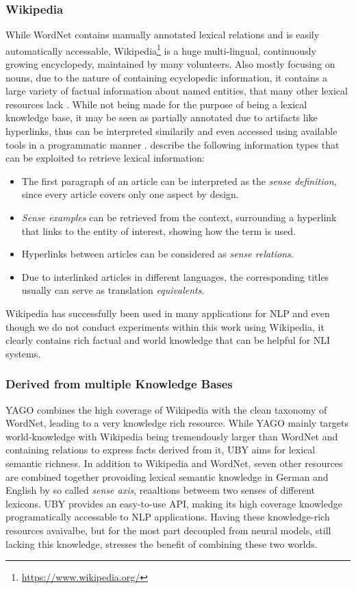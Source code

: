 \subsubsection{Wikipedia}
While WordNet contains manually annotated lexical relations and is easily automatically accessable, Wikipedia\footnote{\href{https://www.wikipedia.org/}{https://www.wikipedia.org/}} is a huge multi-lingual, continuously growing  encyclopedy, maintained by many volunteers. Also mostly focusing on nouns, due to the nature of containing ecyclopedic information, it contains a large variety of factual information about named entities, that many other lexical resources lack \citep{gurevych2016linked}. While not being made for the purpose of being a lexical knowledge base, it may be seen as partially annotated due to artifacts like hyperlinks, thus can be interpreted similarily and even accessed using available tools in a programmatic manner \citep{zesch2008extracting}.  \cite{gurevych2016linked} describe the following information types that can be exploited to retrieve lexical information:
\begin{itemize}
\item The first paragraph of an article can be interpreted as the \textit{sense definition}, since every article covers only one aspect by design.
\item \textit{Sense examples} can be retrieved from the context, surrounding a hyperlink that links to the entity of interest, showing how the term is used.
\item Hyperlinks between articles can be considered as \textit{sense relations}.
\item Due to interlinked articles in different languages, the corresponding titles usually can serve as translation \textit{equivalents}.
\end{itemize}
Wikipedia has successfully been used in many applications for \ac{NLP} and even though we do not conduct experiments within this work using Wikipedia, it clearly contains rich factual and world knowledge that can be helpful for \ac{NLI} systems. 
\subsubsection{Derived from multiple Knowledge Bases}
\ac{YAGO} \citep{suchanek2007yago} combines the high coverage of Wikipedia with the clean taxonomy of WordNet, leading to a very knowledge rich resource. While \ac{YAGO} mainly targets world-knowledge with Wikipedia being tremendously larger than WordNet and containing relations to express facts derived from it, UBY \citep{gurevych2012uby} aims for lexical semantic richness. In addition to Wikipedia and WordNet, seven other resources are combined together provoiding lexical semantic knowledge in German and English by so called \textit{sense axis}, reaaltions betweem two senses of different lexicons. UBY provides an easy-to-use API, making its high coverage knowledge programatically accessable to \ac{NLP} applications. Having these knowledge-rich resources avaivalbe, but for the most part decoupled from neural models, still lacking this knowledge, stresses the benefit of combining these two worlds. 

